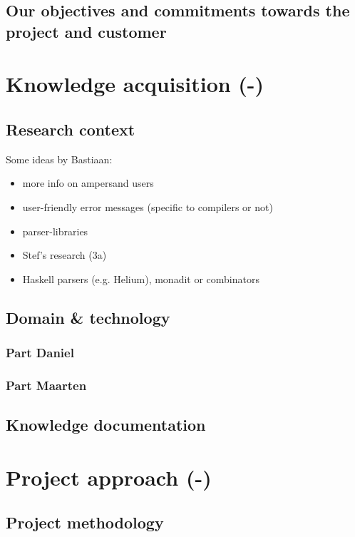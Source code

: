 \documentclass[a4paper,12pt,abstracton,titlepage]{scrartcl}
\begin{document}
\subsection{Our objectives and commitments towards the project and customer}

\section{Knowledge acquisition (-)}
\label{sec:knowledge-acquisition}
\subsection{Research context}
Some ideas by Bastiaan:
\begin{itemize}
  \item more info on ampersand users
  \item user-friendly error messages (specific to compilers or not)
  \item parser-libraries
  \item Stef's research (3a)
  \item Haskell parsers (e.g. Helium), monadit or combinators
\end{itemize}

\subsection{Domain \& technology}
\subsubsection{Part Daniel}
\lipsum[1]

\subsubsection{Part Maarten}
\lipsum[1]

\subsection{Knowledge documentation}
\lipsum[1]

\section{Project approach (-)}
\label{sec:project-approach}
\subsection{Project methodology}
\lipsum[1]
\end{document}
